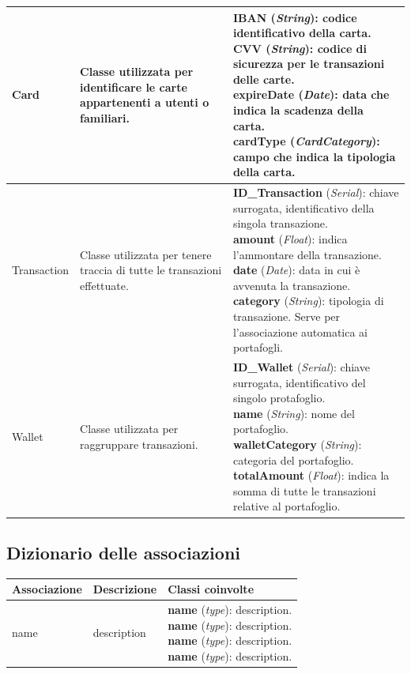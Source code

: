 \begin{longtable}{p{2.5cm}|p{4cm}|p{7.2cm}}
    Card & Classe utilizzata per identificare le carte appartenenti a utenti o familiari. &
    \parbox{7.2cm}{
        \textbf{IBAN} (\textit{String}): codice identificativo della carta. \\
        \textbf{CVV} (\textit{String}): codice di sicurezza per le transazioni delle carte. \\
        \textbf{expireDate} (\textit{Date}): data che indica la scadenza della carta. \\
        \textbf{cardType} (\textit{CardCategory}): campo che indica la tipologia della carta.
    } \\ \hline

    Transaction & Classe utilizzata per tenere traccia di tutte le transazioni effettuate. &
    \parbox{7.2cm}{
        \textbf{ID\_Transaction} (\textit{Serial}): chiave surrogata, identificativo della singola transazione. \\
        \textbf{amount} (\textit{Float}): indica l'ammontare della transazione. \\
        \textbf{date} (\textit{Date}): data in cui è avvenuta la transazione. \\
        \textbf{category} (\textit{String}): tipologia di transazione. Serve per l'associazione automatica ai portafogli.
    } \\ \hline

    Wallet & Classe utilizzata per raggruppare transazioni. &
    \parbox{7.2cm}{
        \textbf{ID\_Wallet} (\textit{Serial}): chiave surrogata, identificativo del singolo protafoglio. \\
        \textbf{name} (\textit{String}): nome del portafoglio. \\
        \textbf{walletCategory} (\textit{String}): categoria del portafoglio. \\
        \textbf{totalAmount} (\textit{Float}): indica la somma di tutte le transazioni relative al portafoglio.
    } \\ \hline

\end{longtable}

\subsection{Dizionario delle associazioni}

\begin{longtable}{p{2.5cm}|p{4cm}|p{7.2cm}}
    
    \rowcolor{black!10}
    \textbf{Associazione} & \textbf{Descrizione} & \textbf{Classi coinvolte} \\ \hline
    \endhead

    name & description &
    \parbox{7.2cm}{
        \textbf{name} (\textit{type}): description. \\
        \textbf{name} (\textit{type}): description. \\
        \textbf{name} (\textit{type}): description. \\
        \textbf{name} (\textit{type}): description.
    } \\ \hline

\end{longtable}

